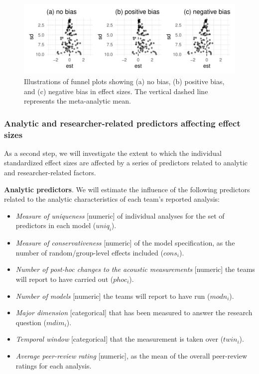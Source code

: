 \documentclass[
  12pt,
]{article}
\providecommand{\tightlist}{%
  \setlength{\itemsep}{0pt}\setlength{\parskip}{0pt}}
\begin{document}
\begin{figure}
\centering
\includegraphics{Draft_RR_files/figure-latex/funnel-plot-1.pdf}
\caption{\label{fig:funnel-plot}Illustrations of funnel plots showing (a) no bias, (b) positive bias, and (c) negative bias in effect sizes. The vertical dashed line represents the meta-analytic mean.}
\end{figure}

\hypertarget{anares-preds}{%
\subsubsection{Analytic and researcher-related predictors affecting effect sizes}\label{anares-preds}}

As a second step, we will investigate the extent to which the individual standardized effect sizes are affected by a series of predictors related to analytic and researcher-related factors.

\textbf{Analytic predictors}. We will estimate the influence of the following predictors related to the analytic characteristics of each team's reported analysis:

\begin{itemize}
\tightlist
\item
  \emph{Measure of uniqueness} {[}numeric{]} of individual analyses for the set of predictors in each model (\(uniq_i\)).
\item
  \emph{Measure of conservativeness} {[}numeric{]} of the model specification, as the number of random/group-level effects included (\(cons_i\)).
\item
  \emph{Number of post-hoc changes to the acoustic measurements} {[}numeric{]} the teams will report to have carried out (\(phoc_i\)).
\item
  \emph{Number of models} {[}numeric{]} the teams will report to have run (\(modn_i\)).
\item
  \emph{Major dimension} {[}categorical{]} that has been measured to answer the research question (\(mdim_i\)).
\item
  \emph{Temporal window} {[}categorical{]} that the measurement is taken over (\(twin_i\)).
\item
  \emph{Average peer-review rating} {[}numeric{]}, as the mean of the overall peer-review ratings for each analysis.
\end{itemize}
\end{document}
